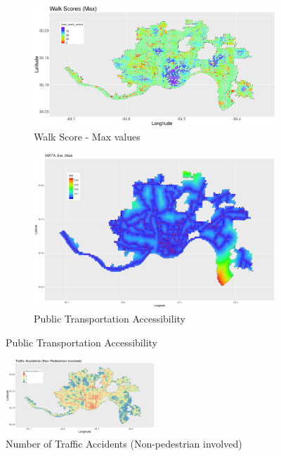 \documentclass{llncs}
\begin{document}
\FloatBarrier
\begin{figure}
  \begin{subfigure}[b]{0.5\textwidth}
    \includegraphics[width = \textwidth, height = \textheight, keepaspectratio]{maxWalkScores.png}
    \caption{Walk Score - Max values}
    \label{figure : 1}
  \end{subfigure}
  \begin{subfigure}[b]{0.5\textwidth}
    \includegraphics[width = \textwidth, height = \textheight, keepaspectratio]{busStopDistance.png}
    \caption{Public Transportation Accessibility}
    \label{figure : 2}
  \end{subfigure}
\end{figure}
\FloatBarrier

\FloatBarrier
\begin{figure}
 	\includegraphics[width=0.5\textwidth, height=0.5\textheight, keepaspectratio]{trafficAccidents.png}
 	\caption{Number of Traffic Accidents (Non-pedestrian involved)}
	\label{figure : trafficAccidents}
\end{figure}
\FloatBarrier
\end{document}
